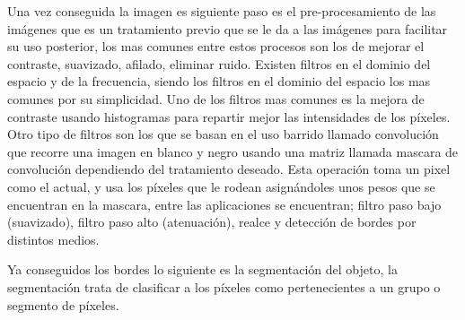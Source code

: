     Una vez conseguida la imagen es siguiente paso es el pre-procesamiento de las imágenes que es un tratamiento previo que se le da a las imágenes para facilitar su uso posterior, los mas comunes entre estos procesos son los de mejorar el contraste, suavizado, afilado, eliminar ruido. Existen filtros en el dominio del espacio y de la frecuencia, siendo los filtros en el dominio del espacio los mas comunes por su simplicidad. Uno de los filtros mas comunes es la mejora de contraste usando histogramas para repartir mejor las intensidades de los píxeles. Otro tipo de filtros son los que se basan en el uso barrido llamado convolución que recorre una imagen en blanco y negro usando una matriz llamada mascara de convolución dependiendo del tratamiento deseado. Esta operación toma un pixel como el actual, y usa los píxeles que le rodean asignándoles unos pesos que se encuentran en la mascara, entre las aplicaciones se encuentran; filtro paso bajo (suavizado), filtro paso alto (atenuación), realce y detección de bordes por distintos medios. %
    
    Ya conseguidos los bordes lo siguiente es la segmentación del objeto, la segmentación trata de clasificar a los píxeles como pertenecientes a un grupo o segmento de píxeles.
    
    
    
    
    

